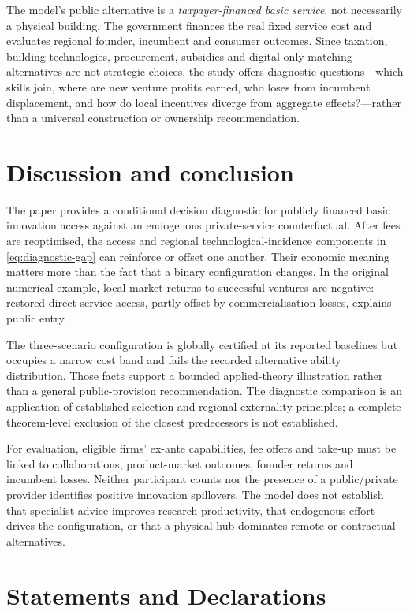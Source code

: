 \documentclass[11pt]{article}
\begin{document}
The model's public alternative is a \emph{taxpayer-financed basic service}, not necessarily a physical building. The government finances the real fixed service cost and evaluates regional founder, incumbent and consumer outcomes. Since taxation, building technologies, procurement, subsidies and digital-only matching alternatives are not strategic choices, the study offers diagnostic questions---which skills join, where are new venture profits earned, who loses from incumbent displacement, and how do local incentives diverge from aggregate effects?---rather than a universal construction or ownership recommendation.

\section{Discussion and conclusion}\label{sec:conclusion}
The paper provides a conditional decision diagnostic for publicly financed basic innovation access against an endogenous private-service counterfactual.
After fees are reoptimised, the access and regional technological-incidence components in \eqref{eq:diagnostic-gap} can reinforce or offset one another.
Their economic meaning matters more than the fact that a binary configuration changes.
In the original numerical example, local market returns to successful ventures are negative: restored direct-service access, partly offset by commercialisation losses, explains public entry.

The three-scenario configuration is globally certified at its reported baselines but occupies a narrow cost band and fails the recorded alternative ability distribution.
Those facts support a bounded applied-theory illustration rather than a general public-provision recommendation.
The diagnostic comparison is an application of established selection and regional-externality principles; a complete theorem-level exclusion of the closest predecessors is not established.

For evaluation, eligible firms' ex-ante capabilities, fee offers and take-up must be linked to collaborations, product-market outcomes, founder returns and incumbent losses.
Neither participant counts nor the presence of a public/private provider identifies positive innovation spillovers.
The model does not establish that specialist advice improves research productivity, that endogenous effort drives the configuration, or that a physical hub dominates remote or contractual alternatives.

\section*{Statements and Declarations}
\end{document}
